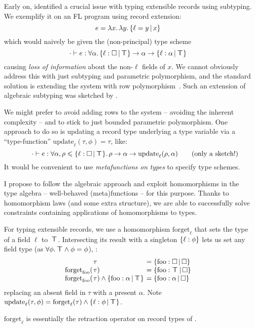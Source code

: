 Early on, \textcite{operations-on-records} identified a crucial issue with typing extensible records using subtyping. We exemplify it on an FL program using record extension:
$$ e = \fllam x \fllam y \flext{\ell = y}{x} $$
which would naively be given the (non-principal) type scheme
$$ \cdot \vdash e : \forall \alpha \ldotp \flext{\ell : \flabsent}{\flftop} \to \alpha \to \flext{\ell : \alpha}{\flftop} $$
causing \emph{loss of information} about the non-$\ell$ fields of $x$. We cannot obviously address this with just subtyping and parametric polymorphism, and the standard solution is extending the system with row polymorphism~\cite{remy-records}. Such an extension of algebraic subtyping was sketched by \citeauthor*{algebraic-subtyping-row-polymorphism} \cite{algebraic-subtyping-row-polymorphism}.

We might prefer to avoid adding rows to the system -- avoiding the inherent complexity -- and to stick to just bounded parametric polymorphism. One approach to do so is updating a record type underlying a type variable via a \enquote{type-function} $\mathrm{update}_\ell(\tau, \phi) = \tau$, like:
$$ \qquad \cdot \vdash e : \forall \alpha, \rho \sub \flext{\ell : \flabsent}{\flftop} \ldotp \rho \to \alpha \to \mathrm{update}_\ell(\rho, \alpha) \qquad \text{(only a sketch!)} $$
It would be convenient to use \emph{metafunctions on types} to specify type schemes.

I propose to follow the algebraic approach and exploit homomorphisms in the type algebra -- well-behaved (meta)functions -- for this purpose. Thanks to homomorphism laws (and some extra structure), we are able to successfully solve constraints containing applications of homomorphisms to types.
\begin{example}
    For typing extensible records, we use a homomorphism $\mathrm{forget}_\ell$ that sets the type of a field $\ell$ to~$\top \!\!\!\! \top$.
    Intersecting its result with a singleton $\flrec{\ell : \phi}$ lets us set any field type (as $\forall \phi \ldotp \top \!\!\!\! \top \land \phi = \phi$), \eg{}:
    \setlength{\tabcolsep}{0pt}
    $$\begin{array}{rll}
        &\hspace{-0.9em}\tau &\;\hspace{-0.9em}= \flext{\mathrm{foo}: \flabsent}{\flabsent} \\
        \mathrm{forget}_\mathrm{foo}( &\hspace{-0.9em}\tau ) &\;\hspace{-0.9em}= \flext{\mathrm{foo}: \flftop}{\flabsent} \\
        \mathrm{forget}_\mathrm{foo}( &\hspace{-0.9em}\tau ) \meet \flext{\mathrm{foo}: \alpha}{\flftop} &\;\hspace{-0.9em}= \flext{\mathrm{foo}: \alpha}{\flabsent}
    \end{array}$$
    replacing an absent field in $\tau$ with a present $\alpha$. Note $\mathrm{update}_\ell(\tau, \phi) = \mathrm{forget}_\ell(\tau) \meet \flext{ \ell : \phi }{\flftop}$.

    $\mathrm{forget}_\ell$ is essentially the retraction operator on record types of \textcite{operations-on-records}.
\end{example}

